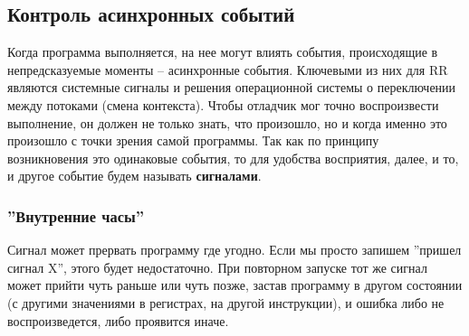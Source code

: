 

\subsection{Контроль асинхронных событий}



Когда программа выполняется, на нее могут влиять события, происходящие в
непредсказуемые моменты – асинхронные события. Ключевыми из них для RR являются
системные сигналы и решения операционной системы о переключении между потоками
(смена контекста). Чтобы отладчик мог точно воспроизвести выполнение, он должен
не только знать, что произошло, но и когда именно это произошло с точки зрения
самой программы. Так как по принципу возникновения это одинаковые события, то
для удобства восприятия, далее, и то, и другое событие будем называть
\textbf{сигналами}.

\subsubsection{''Внутренние часы''}

Сигнал может прервать программу где угодно. Если мы просто запишем ''пришел
сигнал X'', этого будет недостаточно. При повторном запуске тот же сигнал может
прийти чуть раньше или чуть позже, застав программу в другом состоянии (с
другими значениями в регистрах, на другой инструкции), и ошибка либо не
воспроизведется, либо проявится иначе.

